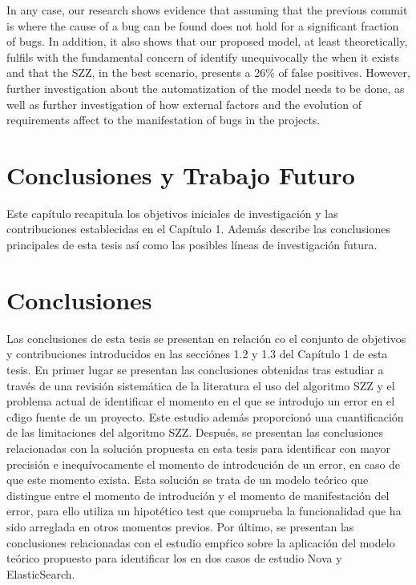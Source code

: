 \documentclass[a4paper, 12pt]{book}
\begin{document}
In any case, our research shows evidence that assuming that the previous commit is where the cause of a bug can be found does not hold for a significant fraction of bugs. In addition, it also shows that our proposed model, at least theoretically, fulfils with the fundamental concern of identify unequivocally the \BIC when it exists and that the SZZ, in the best scenario, presents a 26\% of false positives. However, further investigation about the automatization of the model needs to be done, as well as further investigation of how external factors and the evolution of requirements affect to the manifestation of bugs in the projects.  


\section{Conclusiones y Trabajo Futuro}
Este cap\'itulo recapitula los objetivos iniciales de investigaci\'on y las contribuciones establecidas en el Cap\'itulo 1. Adem\'as describe las conclusiones principales de esta tesis as\'i como las posibles l\'ineas de investigaci\'on futura.
\section{Conclusiones}

Las conclusiones de esta tesis se presentan en relaci\'on co el conjunto de objetivos y contribuciones introducidos en las secci\'ones 1.2 y 1.3 del Cap\'itulo 1 de esta tesis.  En primer lugar se presentan las conclusiones obtenidas tras estudiar a trav\'es de una revisi\'on sistem\'atica de la literatura el uso del algoritmo SZZ y el problema actual de identificar el momento en el que se introdujo un error en el c\'digo fuente de un proyecto. Este estudio adem\'as proporcion\'o una cuantificaci\'on de las limitaciones del algoritmo SZZ. Despu\'es, se presentan las conclusiones relacionadas con la soluci\'on propuesta en esta tesis para identificar con mayor precisi\'on e inequ\'ivocamente el momento de introdcuci\'on de un error, en caso de que este momento exista. Esta soluci\'on se trata de un modelo te\'orico que  distingue entre el momento de introduci\'on y el momento de manifestaci\'on del error, para ello utiliza un hipot\'etico test que comprueba la funcionalidad que ha sido arreglada en otros momentos previos. Por \'ultimo, se presentan las conclusiones relacionadas con el estudio emp\'rico sobre la aplicaci\'on del modelo te\'orico propuesto para identificar los \BIC en dos casos de estudio Nova y ElasticSearch.
\end{document}
